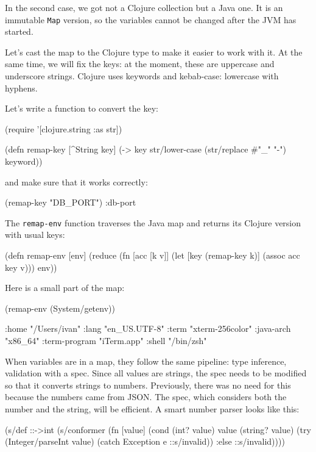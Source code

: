 \fi

In the second case, we got not a Clojure collection but a Java one. It is an immutable \verb|Map| version, so the variables cannot be changed after the JVM has started.

Let's cast the map to the Clojure type to make it easier to work with it. At the same time, we will fix the keys: at the moment, these are uppercase and underscore strings. Clojure uses keywords and kebab-case: lowercase with hyphens.

Let's write a function to convert the key:

\begin{clojure}
(require '[clojure.string :as str])

(defn remap-key [^String key]
  (-> key
      str/lower-case
      (str/replace #"_" "-")
      keyword))
\end{clojure}

\noindent
and make sure that it works correctly:

\begin{clojure}
(remap-key "DB_PORT")
:db-port
\end{clojure}


The \verb|remap-env| function traverses the Java map and returns its Clojure version with usual keys:

\begin{clojure}
(defn remap-env [env]
  (reduce
   (fn [acc [k v]]
     (let [key (remap-key k)]
       (assoc acc key v)))
   {}
   env))
\end{clojure}

Here is a small part of the map:

\begin{clojure}
(remap-env (System/getenv))

{:home "/Users/ivan"
 :lang "en_US.UTF-8"
 :term "xterm-256color"
 :java-arch "x86_64"
 :term-program "iTerm.app"
 :shell "/bin/zsh"}
\end{clojure}

When variables are in a map, they follow the same pipeline: type inference, validation with a spec. Since all values are strings, the spec needs to be modified so that it converts strings to numbers. Previously, there was no need for this because the numbers came from JSON. The spec, which considers both the number and the string, will be efficient. A smart number parser looks like this:

\begin{clojure}
(s/def ::->int
  (s/conformer
   (fn [value]
     (cond
       (int? value) value
       (string? value)
       (try (Integer/parseInt value)
            (catch Exception e
              ::s/invalid))
       :else ::s/invalid))))
\end{clojure}


